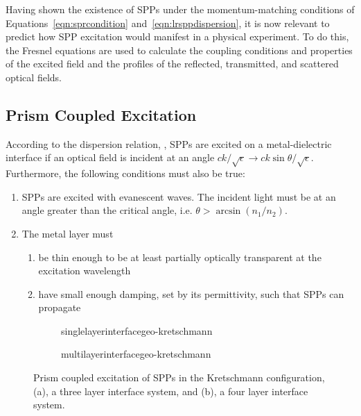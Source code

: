 Having shown the existence of SPPs under the momentum-matching conditions
of Equations~\ref{eqn:sprcondition} and~\ref{eqn:lrsppdispersion}, it is
now relevant to predict how SPP excitation would manifest in a physical
experiment.  To do this, the Fresnel equations are used to calculate the
coupling conditions and properties of the excited field and the profiles of
the reflected, transmitted, and scattered optical fields.  

\subsection{Prism Coupled Excitation}
According to the dispersion relation, , SPPs are
excited on a metal-dielectric interface if an optical field is incident at
an angle $ck/\sqrt{\epsilon} \to ck\sin\theta/\sqrt{\epsilon}$.
Furthermore, the following conditions must also be true:
\begin{enumerate}
\item SPPs are excited with evanescent waves.  The
incident light must be at an angle greater than the critical angle, i.e.
$\theta>\arcsin\left(n_1/n_2\right)$.
\item The metal layer must
\begin{enumerate}
\item be thin enough to be at least partially optically transparent at the excitation wavelength
\item have small enough damping, set by its permittivity, such that SPPs can propagate
\end{enumerate}
\end{enumerate}

\begin{figure}[ht]
 \centering
 \begin{subfigure}[b]{0.4\textwidth}
  \centering
  {singlelayerinterfacegeo-kretschmann}
  \caption{}
 \end{subfigure}
 \begin{subfigure}[b]{0.4\textwidth}
  {multilayerinterfacegeo-kretschmann}
  \caption{}
 \end{subfigure}
\caption{Prism coupled excitation of SPPs in the Kretschmann configuration,
(a), a three layer interface system, and (b), a four layer interface system. }
\label{fig:prismcoupledsetups}
\end{figure}

